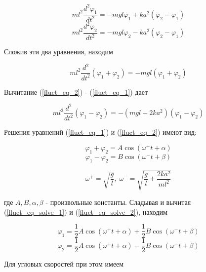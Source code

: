 \documentclass[14pt]{article}
\begin{document}
\begin{equation}\label{fluct_eq_1}
ml^2\frac{d^2\varphi_1}{dt^2} = -mgl\varphi_1 + ka^2(\varphi_2 - \varphi_1)
\end{equation}	
\begin{equation}\label{fluct_eq_2}
ml^2\frac{d^2\varphi_2}{dt^2} = -mgl\varphi_2 - ka^2(\varphi_2 - \varphi_1)
\end{equation}

\noindent Сложив эти два уравнения, находим

\begin{equation}\label{fluct_sum}
ml^2\frac{d^2}{dt^2}(\varphi_1 + \varphi_2) = -mgl(\varphi_1 + \varphi_2)
\end{equation}

Вычитание (\ref{fluct_eq_2}) - (\ref{fluct_eq_1}) дает

\begin{equation}\label{fluct_div}
ml^2\frac{d^2}{dt^2}(\varphi_1 - \varphi_2) = -(mgl + 2ka^2)(\varphi_1 - \varphi_2)
\end{equation}


%
%

Решения уравнений (\ref{fluct_eq_1}) и (\ref{fluct_eq_2}) имеют вид:

\begin{equation}\label{fluct_eq_solve_1}
\varphi_1 + \varphi_2 = A\cos(\omega^+t + \alpha)
\end{equation}
\begin{equation}\label{fluct_eq_solve_2}
\varphi_1 - \varphi_2 = B\cos(\omega^-t + \beta)
\end{equation}

$$\omega^+ = \sqrt{\frac{g}{l}}, ~ \omega^- = \sqrt{\frac{g}{l} + \frac{2ka^2}{ml^2}}$$

\noindent где $A, B, \alpha, \beta$ - произвольные константы. Сладывая и вычитая (\ref{fluct_eq_solve_1}) и (\ref{fluct_eq_solve_2}), находим

\begin{equation}\label{ph_1}
\varphi_1 = \frac{1}{2}A\cos(\omega^+t + \alpha) + \frac{1}{2}B\cos(\omega^-t + \beta)
\end{equation}
\begin{equation}\label{ph_2}
\varphi_2 = \frac{1}{2}A\cos(\omega^+t + \alpha) - \frac{1}{2}B\cos(\omega^-t + \beta)
\end{equation}

\noindent Для угловых скоростей при этом имеем
\end{document}
